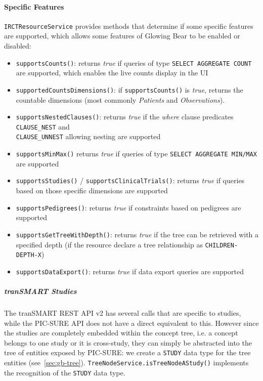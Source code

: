 \paragraph{Specific Features}
\label{sec:specific-features}

\verb|IRCTResourceService| provides methods that determine if some specific features are supported, which allows some features of Glowing Bear to be enabled or disabled:
\begin{itemize}
    \item \verb|supportsCounts()|: returns \emph{true} if queries of type \verb|SELECT AGGREGATE COUNT| are supported, which enables the live counts display in the UI
    \item \verb|supportedCountsDimensions()|: if \verb|supportsCounts()| is \emph{true}, returns the countable dimensions (most commonly \emph{Patients} and \emph{Observations}).
    \item \verb|supportsNestedClauses()|: returns \emph{true} if the \emph{where} clause predicates \verb|CLAUSE_NEST| and \\
    \verb|CLAUSE_UNNEST| allowing nesting are supported
    \item \verb|supportsMinMax()| returns \emph{true} if queries of type \verb|SELECT AGGREGATE MIN/MAX| are supported
    \item \verb|supportsStudies()| / \verb|supportsClinicalTrials()|: returns \emph{true} if queries based on those specific dimensions are supported 
    \item \verb|supportsPedigrees()|: returns \emph{true} if constraints based on pedigrees are supported
    \item \verb|supportsGetTreeWithDepth()|: returns \emph{true} if the tree can be retrieved with a specified depth (if the resource declare a tree relationship as \verb|CHILDREN-DEPTH-X|)
    \item \verb|supportsDataExport()|: returns \emph{true} if data export queries are supported
\end{itemize}


\subparagraph{tranSMART Studies}

The tranSMART REST API v2 has several calls that are specific to studies, while the PIC-SURE API does not have a direct equivalent to this.
However since the studies are completely embedded within the concept tree, i.e. a concept belongs to one study or it is cross-study, they can simply be abstracted into the tree of entities exposed by PIC-SURE: we create a \verb|STUDY| data type for the tree entities (see~\ref{sec:gb-tree}).
\verb|TreeNodeService.isTreeNodeAStudy()| implements the recognition of the \verb|STUDY| data type.

